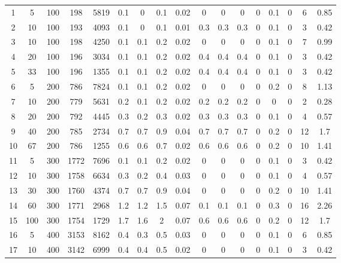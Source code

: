 \documentclass[11pt]{article}
\begin{document}
\begin{landscape}
\begin{longtable}[c]{ccccc|cccc|cccc|cccc}
		\endhead
		\rowcolor[HTML]{EFEFEF} 
		1 & 5 & 100 & 198 & 5819 & 0.1 & 0 & 0.1 & 0.02 & 0 & 0 & 0 & 0 & 0.1 & 0 & 6 & 0.85 \\
		\rowcolor[HTML]{EFEFEF} 
		2 & 10 & 100 & 193 & 4093 & 0.1 & 0 & 0.1 & 0.01 & 0.3 & 0.3 & 0.3 & 0 & 0.1 & 0 & 3 & 0.42 \\
		\rowcolor[HTML]{EFEFEF} 
		3 & 10 & 100 & 198 & 4250 & 0.1 & 0.1 & 0.2 & 0.02 & 0 & 0 & 0 & 0 & 0.1 & 0 & 7 & 0.99 \\
		\rowcolor[HTML]{EFEFEF} 
		4 & 20 & 100 & 196 & 3034 & 0.1 & 0.1 & 0.2 & 0.02 & 0.4 & 0.4 & 0.4 & 0 & 0.1 & 0 & 3 & 0.42 \\
		\rowcolor[HTML]{EFEFEF} 
		5 & 33 & 100 & 196 & 1355 & 0.1 & 0.1 & 0.2 & 0.02 & 0.4 & 0.4 & 0.4 & 0 & 0.1 & 0 & 3 & 0.42 \\
		6 & 5 & 200 & 786 & 7824 & 0.1 & 0.1 & 0.2 & 0.02 & 0 & 0 & 0 & 0 & 0.2 & 0 & 8 & 1.13 \\
		7 & 10 & 200 & 779 & 5631 & 0.2 & 0.1 & 0.2 & 0.02 & 0.2 & 0.2 & 0.2 & 0 & 0 & 0 & 2 & 0.28 \\
		8 & 20 & 200 & 792 & 4445 & 0.3 & 0.2 & 0.3 & 0.02 & 0.3 & 0.3 & 0.3 & 0 & 0.1 & 0 & 4 & 0.57 \\
		9 & 40 & 200 & 785 & 2734 & 0.7 & 0.7 & 0.9 & 0.04 & 0.7 & 0.7 & 0.7 & 0 & 0.2 & 0 & 12 & 1.7 \\
		10 & 67 & 200 & 786 & 1255 & 0.6 & 0.6 & 0.7 & 0.02 & 0.6 & 0.6 & 0.6 & 0 & 0.2 & 0 & 10 & 1.41 \\
		\rowcolor[HTML]{EFEFEF} 
		11 & 5 & 300 & 1772 & 7696 & 0.1 & 0.1 & 0.2 & 0.02 & 0 & 0 & 0 & 0 & 0.1 & 0 & 3 & 0.42 \\
		\rowcolor[HTML]{EFEFEF} 
		12 & 10 & 300 & 1758 & 6634 & 0.3 & 0.2 & 0.4 & 0.03 & 0 & 0 & 0 & 0 & 0.1 & 0 & 4 & 0.57 \\
		\rowcolor[HTML]{EFEFEF} 
		13 & 30 & 300 & 1760 & 4374 & 0.7 & 0.7 & 0.9 & 0.04 & 0 & 0 & 0 & 0 & 0.2 & 0 & 10 & 1.41 \\
		\rowcolor[HTML]{EFEFEF} 
		14 & 60 & 300 & 1771 & 2968 & 1.2 & 1.2 & 1.5 & 0.07 & 0.1 & 0.1 & 0.1 & 0 & 0.3 & 0 & 16 & 2.26 \\
		\rowcolor[HTML]{EFEFEF} 
		15 & 100 & 300 & 1754 & 1729 & 1.7 & 1.6 & 2 & 0.07 & 0.6 & 0.6 & 0.6 & 0 & 0.2 & 0 & 12 & 1.7 \\
		16 & 5 & 400 & 3153 & 8162 & 0.4 & 0.3 & 0.5 & 0.03 & 0 & 0 & 0 & 0 & 0.1 & 0 & 6 & 0.85 \\
		17 & 10 & 400 & 3142 & 6999 & 0.4 & 0.4 & 0.5 & 0.02 & 0 & 0 & 0 & 0 & 0.1 & 0 & 3 & 0.42 \\

\end{longtable}
\end{landscape}
\end{document}
